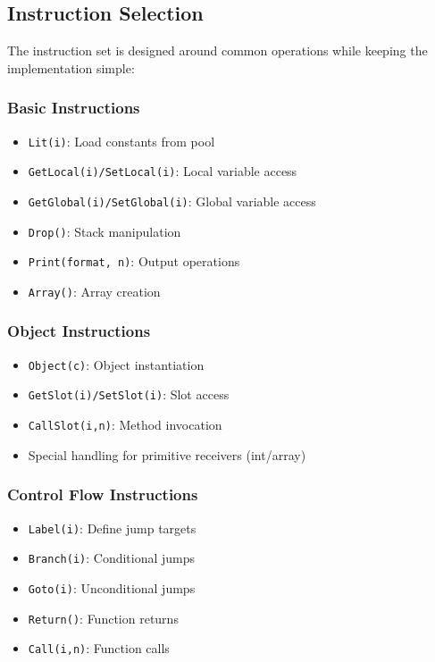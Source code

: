 \documentclass[12pt, a4paper]{article}
\begin{document}
\subsection{Instruction Selection}
The instruction set is designed around common operations while keeping the implementation simple:

\subsubsection{Basic Instructions}
\begin{itemize}
\item \texttt{Lit(i)}: Load constants from pool
\item \texttt{GetLocal(i)/SetLocal(i)}: Local variable access
\item \texttt{GetGlobal(i)/SetGlobal(i)}: Global variable access
\item \texttt{Drop()}: Stack manipulation
\item \texttt{Print(format, n)}: Output operations
\item \texttt{Array()}: Array creation
\end{itemize}

\subsubsection{Object Instructions}
\begin{itemize}
\item \texttt{Object(c)}: Object instantiation
\item \texttt{GetSlot(i)/SetSlot(i)}: Slot access
\item \texttt{CallSlot(i,n)}: Method invocation
\item Special handling for primitive receivers (int/array)
\end{itemize}

\subsubsection{Control Flow Instructions}
\begin{itemize}
\item \texttt{Label(i)}: Define jump targets
\item \texttt{Branch(i)}: Conditional jumps
\item \texttt{Goto(i)}: Unconditional jumps
\item \texttt{Return()}: Function returns
\item \texttt{Call(i,n)}: Function calls
\end{itemize}
\end{document}

